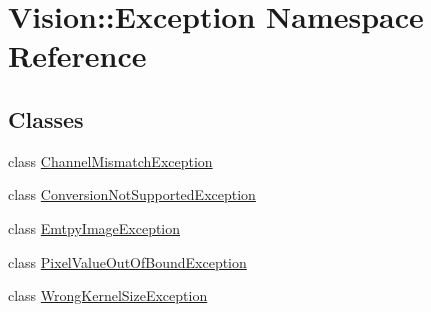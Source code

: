 \hypertarget{namespace_vision_1_1_exception}{}\section{Vision\+:\+:Exception Namespace Reference}
\label{namespace_vision_1_1_exception}
\subsection*{Classes}
\begin{DoxyCompactItemize}
\item 
class \hyperlink{class_vision_1_1_exception_1_1_channel_mismatch_exception}{Channel\+Mismatch\+Exception}
\item 
class \hyperlink{class_vision_1_1_exception_1_1_conversion_not_supported_exception}{Conversion\+Not\+Supported\+Exception}
\item 
class \hyperlink{class_vision_1_1_exception_1_1_emtpy_image_exception}{Emtpy\+Image\+Exception}
\item 
class \hyperlink{class_vision_1_1_exception_1_1_pixel_value_out_of_bound_exception}{Pixel\+Value\+Out\+Of\+Bound\+Exception}
\item 
class \hyperlink{class_vision_1_1_exception_1_1_wrong_kernel_size_exception}{Wrong\+Kernel\+Size\+Exception}
\end{DoxyCompactItemize}
